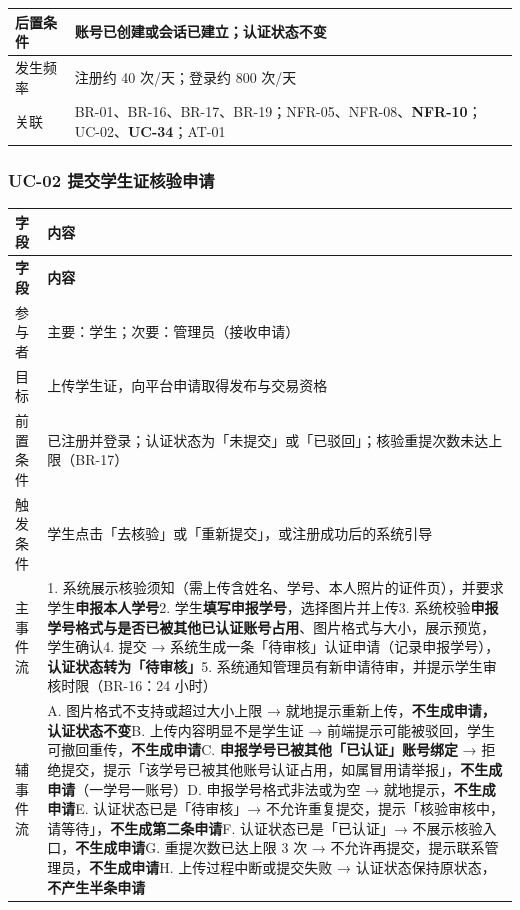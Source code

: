 \documentclass[12pt,a4paper]{ctexart}
\begin{document}
{\begin{longtable}{|p{2.75cm}|p{13.25cm}|}
\hline
后置条件 & 账号已创建或会话已建立；认证状态不变 \\
\hline
发生频率 & 注册约 40 次/天；登录约 800 次/天 \\
\hline
关联 & BR-01、BR-16、BR-17、BR-19；NFR-05、NFR-08、\textbf{NFR-10}；UC-02、\textbf{UC-34}；AT-01 \\
\hline
\end{longtable}
}



\subsubsection*{UC-02 提交学生证核验申请}

{\scriptsize
\begin{longtable}{|p{2.75cm}|p{13.25cm}|}
\hline
\textbf{字段} & \textbf{内容} \\
\hline
\endfirsthead
\hline
\textbf{字段} & \textbf{内容} \\
\hline
\endhead
\hline
\endfoot
参与者 & 主要：学生；次要：管理员（接收申请） \\
\hline
目标 & 上传学生证，向平台申请取得发布与交易资格 \\
\hline
前置条件 & 已注册并登录；认证状态为「未提交」或「已驳回」；核验重提次数未达上限（BR-17） \\
\hline
触发条件 & 学生点击「去核验」或「重新提交」，或注册成功后的系统引导 \\
\hline
主事件流 & 1. 系统展示核验须知（需上传含姓名、学号、本人照片的证件页），并要求学生\textbf{申报本人学号}\newline{}2. 学生\textbf{填写申报学号}，选择图片并上传\newline{}3. 系统校验\textbf{申报学号格式与是否已被其他已认证账号占用}、图片格式与大小，展示预览，学生确认\newline{}4. 提交 → 系统生成一条「待审核」认证申请（记录申报学号），\textbf{认证状态转为「待审核」}\newline{}5. 系统通知管理员有新申请待审，并提示学生审核时限（BR-16：24 小时） \\
\hline
辅事件流 & A. 图片格式不支持或超过大小上限 → 就地提示重新上传，\textbf{不生成申请，认证状态不变}\newline{}B. 上传内容明显不是学生证 → 前端提示可能被驳回，学生可撤回重传，\textbf{不生成申请}\newline{}C. \textbf{申报学号已被其他「已认证」账号绑定} → 拒绝提交，提示「该学号已被其他账号认证占用，如属冒用请举报」，\textbf{不生成申请}（一学号一账号）\newline{}D. 申报学号格式非法或为空 → 就地提示，\textbf{不生成申请}\newline{}E. 认证状态已是「待审核」→ 不允许重复提交，提示「核验审核中，请等待」，\textbf{不生成第二条申请}\newline{}F. 认证状态已是「已认证」→ 不展示核验入口，\textbf{不生成申请}\newline{}G. 重提次数已达上限 3 次 → 不允许再提交，提示联系管理员，\textbf{不生成申请}\newline{}H. 上传过程中断或提交失败 → 认证状态保持原状态，\textbf{不产生半条申请} \\

\end{longtable}}
\end{document}
